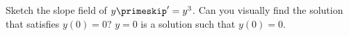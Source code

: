 {Sketch the slope field of $y\primeskip'=y^3$.  Can you visually find the solution that satisfies $y(0)=0$?}
{
$y=0$ is a solution such that $y(0)=0$.\\
}